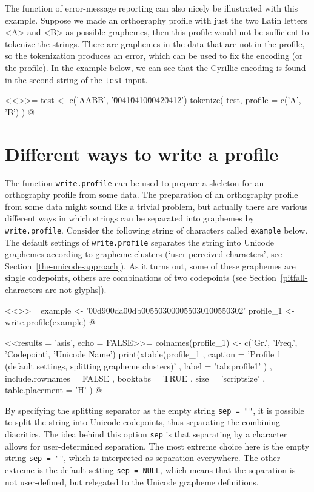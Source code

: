 The function of error-message reporting can also nicely be illustrated
with this example. Suppose we made an orthography profile with just the two
Latin letters <A> and <B> as possible graphemes, then this profile would not be
sufficient to tokenize the strings. There are graphemes in the data that are not
in the profile, so the tokenization produces an error, which can be used to fix
the encoding (or the profile). In the example below, we can see that the
Cyrillic encoding is found in the second string of the \texttt{test} input.

<<>>=
test <- c('AABB', '\u0041\u0410\u0042\u0412')
tokenize( test, profile = c('A', 'B') )
@

\section{Different ways to write a profile}
\label{write-profile}

The function \texttt{write.profile} can be used to prepare a skeleton for an
orthography profile from some data. The preparation of an orthography profile
from some data might sound like a trivial problem, but actually there are
various different ways in which strings can be separated into graphemes by
\texttt{write.profile}. Consider the following string of characters called
\texttt{example} below. The default settings of \texttt{write.profile} separates
the string into Unicode graphemes according to grapheme clusters
(`user-perceived characters', see Section~\ref{the-unicode-approach}). As it 
turns out, some of these graphemes are single codepoints, others are combinations
of two codepoints (see Section~\ref{pitfall-characters-are-not-glyphs}).

<<>>=
example <- '\u00d9\u00da\u00db\u0055\u0300\u0055\u0301\u0055\u0302'
profile_1 <- write.profile(example)
@

<<results = 'asis', echo = FALSE>>=
colnames(profile_1) <- c('Gr.', 'Freq.', 'Codepoint', 'Unicode Name')
print(xtable(profile_1
        , caption = 'Profile 1 (default settings, splitting grapheme clusters)'
        , label = 'tab:profile1'
        )
  , include.rownames = FALSE
  , booktabs = TRUE
  , size = 'scriptsize'
  , table.placement = 'H'
  )
@

By specifying the splitting separator as the empty string
\texttt{sep~=~""}, it is possible to split the string into Unicode codepoints,
thus separating the combining diacritics. The idea behind this option
\texttt{sep} is that separating by a character allows for user-determined
separation. The most extreme choice here is the empty string \texttt{sep~=~""},
which is interpreted as separation everywhere. The other extreme is the default
setting \texttt{sep~=~NULL}, which means that the separation is not
user-defined, but relegated to the Unicode grapheme definitions.

